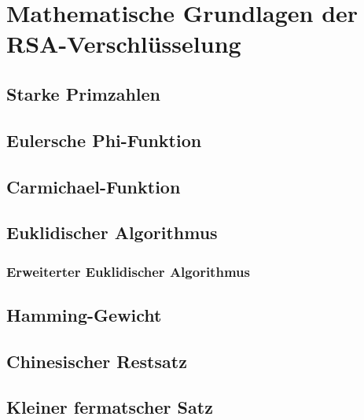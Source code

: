 \chapter{Mathematische Grundlagen der RSA-Verschlüsselung}

\section{Starke Primzahlen}
\newpage
\section{Eulersche Phi-Funktion}
\newpage
\section{Carmichael-Funktion}
\newpage
\section{Euklidischer Algorithmus}
\newpage
\subsection{Erweiterter Euklidischer Algorithmus}
\newpage
\section{Hamming-Gewicht}
\newpage
\section{Chinesischer Restsatz}
\newpage
\section{Kleiner fermatscher Satz}
